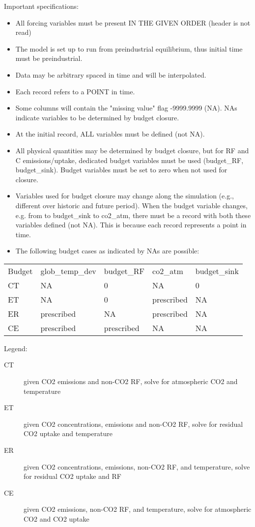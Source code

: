\documentclass[11pt]{article}
\begin{document}
Important specifications:
\begin{itemize}
\item All forcing variables must be present IN THE GIVEN ORDER (header is not read)
\item The model is set up to run from preindustrial equilibrium, thus initial time must be preindustrial.
\item Data may be arbitrary spaced in time and will be interpolated.
\item Each record refers to a POINT in time.
\item Some columns will contain the "missing value" flag -9999.9999 (NA). NAs indicate variables to be determined by budget closure.
\item At the initial record, ALL variables must be defined (not NA).
\item All physical quantities may be determined by budget closure, but for RF and C emissions/uptake, dedicated budget variables must be used (budget\_RF, budget\_sink). Budget variables must be set to zero when not used for closure.
\item Variables used for budget closure may change along the simulation (e.g., different over historic and future period). When the budget variable changes, e.g. from to budget\_sink to co2\_atm, there must be a record with both these variables defined (not NA). This is because each record represents a point in time.
\item The following budget cases as indicated by NAs are possible:
\end{itemize}

\begin{center}
\begin{tabular}{lllll}
Budget & glob\_temp\_dev & budget\_RF & co2\_atm & budget\_sink\\
CT & NA & 0 & NA & 0\\
ET & NA & 0 & prescribed & NA\\
ER & prescribed & NA & prescribed & NA\\
CE & prescribed & prescribed & NA & NA\\
\end{tabular}
\end{center}

Legend:
\begin{description}
\item[{CT}] given CO2 emissions and non-CO2 RF, solve for atmospheric CO2 and temperature
\item[{ET}] given CO2 concentrations, emissions and non-CO2 RF, solve for residual CO2 uptake and temperature
\item[{ER}] given CO2 concentrations, emissions, non-CO2 RF, and temperature, solve for residual CO2 uptake and RF
\item[{CE}] given CO2 emissions, non-CO2 RF, and temperature, solve for atmospheric CO2 and CO2 uptake
\end{description}
\end{document}

